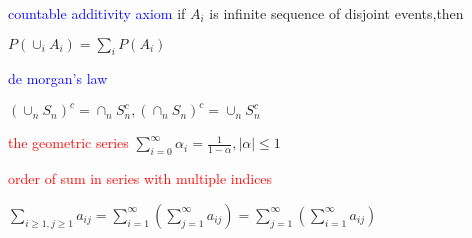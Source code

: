 \textcolor{blue}{countable additivity axiom} if $A_i$ is infinite sequence of disjoint events,then

$P(\cup _i A_i)=\sum_i P(A_i)$

\textcolor{blue}{de morgan's law}

$(\cup_n S_n)^c=\cap _n S_n^c,(\cap_n S_n)^c=\cup _n S_n^c$


\textcolor{red}{the geometric series} $\sum_{i=0}^\infty \alpha_i=\frac{1}{1-\alpha},|\alpha|\le 1$

\textcolor{red}{order of sum in series with multiple indices}

$\sum_{i\geq 1,j\geq 1}a_{ij}=\sum _{i=1}^\infty (\sum_{j=1}^\infty a_{ij})=\sum_{j=1}^\infty (\sum_{i=1}^\infty a_{ij})$

